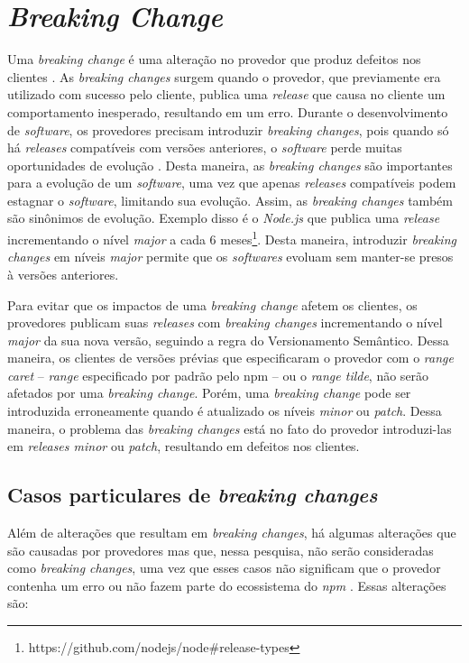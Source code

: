 \section{\textit{Breaking Change}}
\label{ref-teo:breaking_change}
Uma \textit{breaking change} é uma alteração no provedor que produz defeitos nos clientes \cite{teorical_reference:semver}. As \textit{breaking changes} surgem quando o provedor, que previamente era utilizado com sucesso pelo cliente, publica uma \textit{release} que causa no cliente um comportamento inesperado, resultando em um erro. Durante o desenvolvimento de \textit{software}, os provedores precisam introduzir \textit{breaking changes}, pois quando só há \textit{releases} compatíveis com versões anteriores, o \textit{software} perde muitas oportunidades de evolução \cite{teorical_reference:bc_2}. Desta maneira, as \textit{breaking changes} são importantes para a evolução de um \textit{software}, uma vez que apenas \textit{releases} compatíveis podem estagnar o \textit{software}, limitando sua evolução. Assim, as \textit{breaking changes} também são sinônimos de evolução. Exemplo disso é o \textit{Node.js} que publica uma \textit{release} incrementando o nível \textit{major} a cada 6 meses\footnote{https://github.com/nodejs/node\#release-types}. Desta maneira, introduzir \textit{breaking changes} em níveis \textit{major} permite que os \textit{softwares} evoluam sem manter-se presos à versões anteriores.

Para evitar que os impactos de uma \textit{breaking change} afetem os clientes, os provedores publicam suas \textit{releases} com \textit{breaking changes} incrementando o nível \textit{major} da sua nova versão, seguindo a regra do Versionamento Semântico. Dessa maneira, os clientes de versões prévias que especificaram o provedor com o \textit{range caret} -- \textit{range} especificado por padrão pelo \gls{npm} -- ou o \textit{range tilde}, não serão afetados por uma \textit{breaking change}. Porém, uma \textit{breaking change} pode ser introduzida erroneamente quando é atualizado os níveis \textit{minor} ou \textit{patch}. Dessa maneira, o problema das \textit{breaking changes} está no fato do provedor introduzi-las em \textit{releases minor} ou \textit{patch}, resultando em defeitos nos clientes.

\subsection{Casos particulares de \textit{breaking changes}}
Além de alterações que resultam em \textit{breaking changes}, há algumas alterações que são causadas por provedores mas que, nessa pesquisa, não serão consideradas como \textit{breaking changes}, uma vez que esses casos não significam que o provedor contenha um erro ou não fazem parte do ecossistema do \textit{npm} . Essas alterações são:


